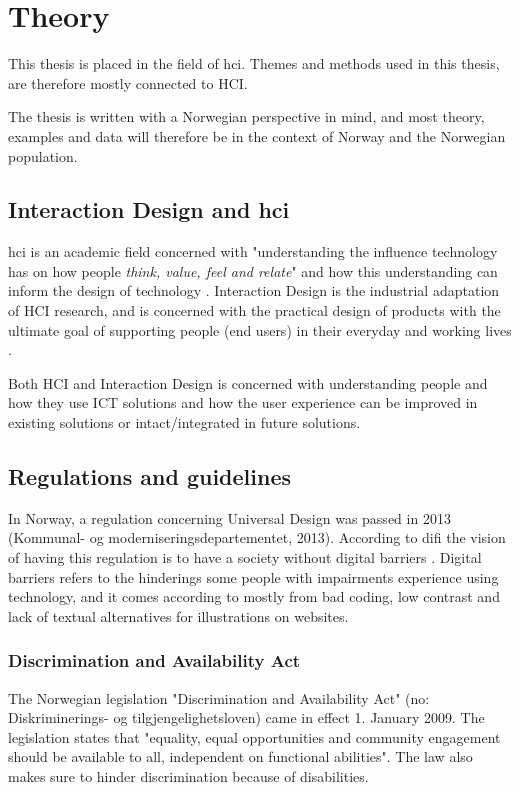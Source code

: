 \chapter{Theory}
This thesis is placed in the field of \acrfull{hci}. Themes and methods used in this thesis, are therefore mostly connected to HCI.

The thesis is written with a Norwegian perspective in mind, and most theory, examples and data will therefore be in the context of Norway and the Norwegian population. 

\section{Interaction Design and \acrfull{hci}} 
\acrshort{hci} is an academic field concerned with "understanding the influence technology has on how people \textit{think, value, feel and relate}" and how this understanding can inform the design of technology \parencite{wright_empathy_2008}. Interaction Design is the industrial adaptation of HCI research, and is concerned with the practical design of products with the ultimate goal of supporting people (end users) in their everyday and working lives \parencite{rogers_interaction_2011}.

Both HCI and Interaction Design is concerned with understanding people and how they use ICT solutions and how the user experience can be improved in existing solutions or intact/integrated in future solutions.




\section{Regulations and guidelines}
In Norway, a regulation concerning Universal Design was passed in 2013 (Kommunal- og moderniseringsdepartementet, 2013). According to \Gls{difi} the vision of having this regulation is to have a society without digital barriers \parencite{difi_digitale_2015}. Digital barriers refers to the hinderings some people with impairments experience using technology, and it comes according to \textcite{malin_rygg_dei_2015} mostly from bad coding, low contrast and lack of textual alternatives for illustrations on websites. 

\subsection{Discrimination and Availability Act}
The Norwegian legislation "Discrimination and Availability Act" (no: Diskriminerings- og tilgjengelighetsloven) came in effect 1. January 2009. The legislation states that "equality, equal opportunities and community engagement should be available to all, independent on functional abilities". The law also makes sure to hinder discrimination because of disabilities.

